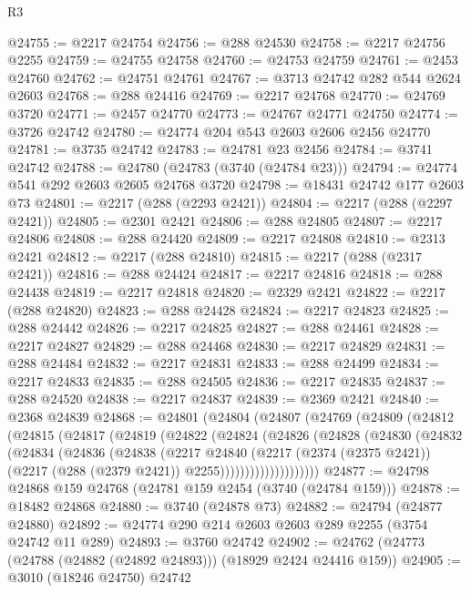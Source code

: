 \begin{lexlean}{R3}
\begin{coremodule}
@24755 := @2217 @24754
@24756 := @288 @24530
@24758 := @2217 @24756 @2255
@24759 := @24755 @24758
@24760 := @24753 @24759
@24761 := @2453 @24760
@24762 := @24751 @24761
@24767 := @3713 @24742 @282 @544 @2624 @2603
@24768 := @288 @24416
@24769 := @2217 @24768
@24770 := @24769 @3720
@24771 := @2457 @24770
@24773 := @24767 @24771 @24750
@24774 := @3726 @24742
@24780 := @24774 @204 @543 @2603 @2606 @2456 @24770
@24781 := @3735 @24742
@24783 := @24781 @23 @2456
@24784 := @3741 @24742
@24788 := @24780 (@24783 (@3740 (@24784 @23)))
@24794 := @24774 @541 @292 @2603 @2605 @24768 @3720
@24798 := @18431 @24742 @177 @2603 @73
@24801 := @2217 (@288 (@2293 @2421))
@24804 := @2217 (@288 (@2297 @2421))
@24805 := @2301 @2421
@24806 := @288 @24805
@24807 := @2217 @24806
@24808 := @288 @24420
@24809 := @2217 @24808
@24810 := @2313 @2421
@24812 := @2217 (@288 @24810)
@24815 := @2217 (@288 (@2317 @2421))
@24816 := @288 @24424
@24817 := @2217 @24816
@24818 := @288 @24438
@24819 := @2217 @24818
@24820 := @2329 @2421
@24822 := @2217 (@288 @24820)
@24823 := @288 @24428
@24824 := @2217 @24823
@24825 := @288 @24442
@24826 := @2217 @24825
@24827 := @288 @24461
@24828 := @2217 @24827
@24829 := @288 @24468
@24830 := @2217 @24829
@24831 := @288 @24484
@24832 := @2217 @24831
@24833 := @288 @24499
@24834 := @2217 @24833
@24835 := @288 @24505
@24836 := @2217 @24835
@24837 := @288 @24520
@24838 := @2217 @24837
@24839 := @2369 @2421
@24840 := @2368 @24839
@24868 := @24801
    (@24804
      (@24807
        (@24769
          (@24809
            (@24812
              (@24815
                (@24817
                  (@24819
                    (@24822
                      (@24824
                        (@24826
                          (@24828
                            (@24830
                              (@24832
                                (@24834
                                  (@24836
                                    (@24838
                                      (@2217
                                        @24840
                                        (@2217
                                          (@2374 (@2375 @2421))
                                          (@2217 (@288 (@2379 @2421)) @2255))))))))))))))))))))
@24877 := @24798 @24868 @159 @24768 (@24781 @159 @2454 (@3740 (@24784 @159)))
@24878 := @18482 @24868
@24880 := @3740 (@24878 @73)
@24882 := @24794 (@24877 @24880)
@24892 := @24774 @290 @214 @2603 @2603 @289 @2255 (@3754 @24742 @11 @289)
@24893 := @3760 @24742
@24902 := @24762 (@24773 (@24788 (@24882 (@24892 @24893))) (@18929 @2424 @24416 @159))
@24905 := @3010 (@18246 @24750) @24742

\end{coremodule}
\end{lexlean}
